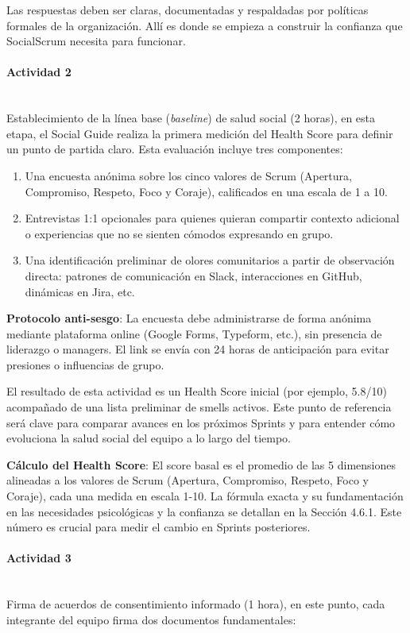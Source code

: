 Las respuestas deben ser claras, documentadas y respaldadas por políticas formales de la organización. Allí es donde se empieza a construir la confianza que SocialScrum necesita para funcionar.

\paragraph{Actividad 2}
\mbox{}\\[-0.1\baselineskip]
Establecimiento de la línea base (\textit{baseline}) de salud social (2 horas), en esta etapa, el Social Guide realiza la primera medición del Health Score para definir un punto de partida claro. Esta evaluación incluye tres componentes:

\begin{enumerate}
    \item Una encuesta anónima sobre los cinco valores de Scrum (Apertura, Compromiso, Respeto, Foco y Coraje), calificados en una escala de 1 a 10.
    \item Entrevistas 1:1 opcionales para quienes quieran compartir contexto adicional o experiencias que no se sienten cómodos expresando en grupo.
    \item Una identificación preliminar de olores comunitarios a partir de observación directa: patrones de comunicación en Slack, interacciones en GitHub, dinámicas en Jira, etc.
\end{enumerate}

\textbf{Protocolo anti-sesgo}: La encuesta debe administrarse de forma anónima mediante plataforma online (Google Forms, Typeform, etc.), sin presencia de liderazgo o managers. El link se envía con 24 horas de anticipación para evitar presiones o influencias de grupo.

El resultado de esta actividad es un Health Score inicial (por ejemplo, 5.8/10) acompañado de una lista preliminar de smells activos. Este punto de referencia será clave para comparar avances en los próximos Sprints y para entender cómo evoluciona la salud social del equipo a lo largo del tiempo.

\textbf{Cálculo del Health Score}: El score basal es el promedio de las 5 dimensiones alineadas a los valores de Scrum (Apertura, Compromiso, Respeto, Foco y Coraje), cada una medida en escala 1-10. La fórmula exacta y su fundamentación en las necesidades psicológicas y la confianza se detallan en la Sección 4.6.1. Este número es crucial para medir el cambio en Sprints posteriores.

\paragraph{Actividad 3}
\mbox{}\\[-0.1\baselineskip]
Firma de acuerdos de consentimiento informado (1 hora), en este punto, cada integrante del equipo firma dos documentos fundamentales:

